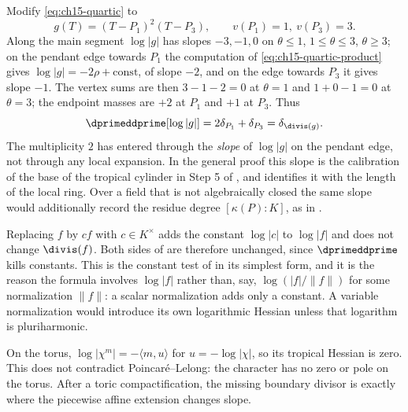 \begin{example}
\label{ex:ch15-double-root}
Modify \eqref{eq:ch15-quartic} to
\[
 g(T)=(T-P_1)^2(T-P_3),\qquad v(P_1)=1,\ v(P_3)=3 .
\]
Along the main segment $\log|g|$ has slopes $-3,-1,0$ on $\theta\le1$,
$1\le\theta\le3$, $\theta\ge3$; on the pendant edge towards $P_1$ the
computation of \eqref{eq:ch15-quartic-product} gives
$\log|g|=-2\rho+\text{const}$, of slope $-2$, and on the edge towards $P_3$
it gives slope $-1$.  The vertex sums are then $3-1-2=0$ at $\theta=1$ and
$1+0-1=0$ at $\theta=3$; the endpoint masses are $+2$ at $P_1$ and $+1$ at
$P_3$.  Thus
\[
 \dprimeddprime[\log|g|]=2\delta_{P_1}+\delta_{P_3}
 =\delta_{\divis(g)} .
\]
The multiplicity $2$ has entered through the \emph{slope} of $\log|g|$ on the
pendant edge, not through any local expansion.  In the general proof this
slope is the calibration of the base of the tropical cylinder in Step 5 of
, and 
identifies it with the length of the local ring.  Over a field that is not
algebraically closed the same slope would additionally record the residue
degree $[\kappa(P):K]$, as in .
\end{example}

\begin{example}
\label{ex:ch15-constant-shift}
Replacing $f$ by $cf$ with $c\in K^\times$ adds the constant $\log|c|$ to
$\log|f|$ and does not change $\divis(f)$.  Both sides of
 are therefore unchanged, since
$\dprimeddprime$ kills constants.  This is the constant test of
 in its simplest form, and it is the reason the
formula involves $\log|f|$ rather than, say, $\log(|f|/\|f\|)$ for some
normalization $\|f\|$: a scalar normalization adds only a constant.  A variable normalization
would introduce its own logarithmic Hessian unless that logarithm is
pluriharmonic.
\end{example}

\begin{example}
\label{ex:ch15-toric-character}
On the torus, $\log|\chi^m|=-\langle m,u\rangle$ for
$u=-\log|\chi|$, so its tropical Hessian is zero.  This does not contradict
Poincar\'e--Lelong: the character has no zero or pole on the torus.  After a
toric compactification, the missing boundary divisor is exactly where the
piecewise affine extension changes slope.
\end{example}

